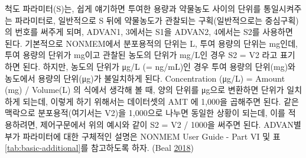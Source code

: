 \documentclass[
  10pt,
  krantz2,
  a4paper]{krantz}
\theoremstyle{definition}
\theoremstyle{definition}
\theoremstyle{definition}
\theoremstyle{remark}
\begin{document}
척도 파라미터(S)는, 쉽게 얘기하면 투여한 용량과 약물농도 사이의 단위를 통일시켜주는 파라미터로, 일반적으로 S 뒤에 약물농도가 관찰되는 구획(일반적으로는 중심구획)의 번호를 써주게 되며, ADVAN1, 3에서는 S1을 ADVAN2, 4에서는 S2를 사용하면 된다. 기본적으로 NONMEM에서 분포용적의 단위는 L, 투여 용량의 단위는 mg인데, 투여 용량의 단위가 mg이고 관찰된 농도의 단위가 mg/L인 경우 S2 = V2 라고 표기하면 된다. 하지만, 농도의 단위가 μg/L (= ng/mL)인 경우 투여 용량의 단위(mg)와 농도에서 용량의 단위(μg)가 불일치하게 된다. Concentration (μg/L) = Amount (mg) / Volume(L) 의 식에서 생각해 볼 때, 양의 단위를 μg으로 변환하면 단위가 일치하게 되는데, 이렇게 하기 위해서는 데이터셋의 AMT 에 1,000을 곱해주면 된다. 같은 맥락으로 분포용적(여기서는 V2)을 1,000으로 나누면 동일한 상황이 되는데, 이를 적용하려면, 제어구문에서 위의 예시와 같이 S2 = V2 / 1000을 써주면 된다. ADVAN별 부가 파라미터에 대한 구체적인 설명은 NONMEM User Guide - Part VI 및 표 \ref{tab:basic-additional}를 참고하도록 하자. (Beal \protect\hyperlink{ref-nonmem}{2018})
\end{document}
